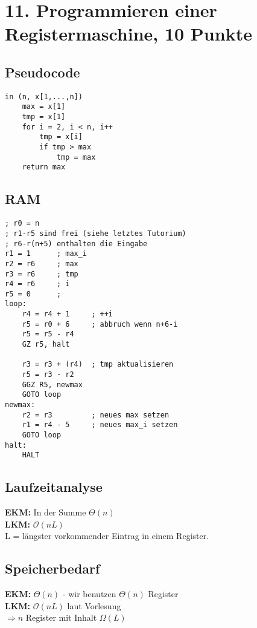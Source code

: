 \documentclass[ngerman,a4paper]{report}
\begin{document}

\newpage
\section*{11.  Programmieren einer Registermaschine, 10 Punkte}
\subsection*{Pseudocode}
\begin{lstlisting}
in (n, x[1,...,n])
    max = x[1]
    tmp = x[1]
    for i = 2, i < n, i++
        tmp = x[i]
        if tmp > max
            tmp = max
    return max
\end{lstlisting}

\subsection*{RAM}
\begin{lstlisting}
; r0 = n
; r1-r5 sind frei (siehe letztes Tutorium)
; r6-r(n+5) enthalten die Eingabe
r1 = 1      ; max_i
r2 = r6    	; max
r3 = r6    	; tmp
r4 = r6     ; i
r5 = 0      ; 
loop:
    r4 = r4 + 1     ; ++i
    r5 = r0 + 6     ; abbruch wenn n+6-i 
    r5 = r5 - r4
    GZ r5, halt

    r3 = r3 + (r4)  ; tmp aktualisieren
    r5 = r3 - r2    
    GGZ R5, newmax
    GOTO loop
newmax:
    r2 = r3         ; neues max setzen
    r1 = r4 - 5     ; neues max_i setzen
    GOTO loop
halt:
	HALT
\end{lstlisting}
\subsection*{Laufzeitanalyse}
\textbf{EKM:} In der Summe $\Theta(n)$\\
\textbf{LKM:} $\mathcal{O} (n L)$\\
L = längster vorkommender Eintrag in einem Register.
\subsection*{Speicherbedarf}
\textbf{EKM:} $\Theta(n)$ - wir benutzen $\Theta(n)$ Register\\
\textbf{LKM:} $\mathcal{O}(nL)$ laut Vorlesung\\
$\Rightarrow n$ Register mit Inhalt $\Omega(L)$\\
\end{document}
